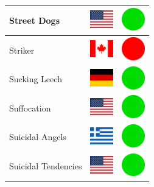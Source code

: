 \documentclass[12pt, a4paper, twoside]{report}
\begin{document}
\begin{center}
\begin{longtable}{|p{5cm}|p{2cm}|p{2cm}|}
Street Dogs & \includegraphics[width=1cm]{4x3/us} & \includegraphics[width=1cm]{likes/y} \\ \hline
Striker & \includegraphics[width=1cm]{4x3/ca} & \includegraphics[width=1cm]{likes/n} \\ \hline
Sucking Leech & \includegraphics[width=1cm]{4x3/de} & \includegraphics[width=1cm]{likes/y} \\ \hline
Suffocation & \includegraphics[width=1cm]{4x3/us} & \includegraphics[width=1cm]{likes/y} \\ \hline
Suicidal Angels & \includegraphics[width=1cm]{4x3/gr} & \includegraphics[width=1cm]{likes/y} \\ \hline
Suicidal Tendencies & \includegraphics[width=1cm]{4x3/us} & \includegraphics[width=1cm]{likes/y} \\ \hline

\end{longtable}
\end{center}
\end{document}
